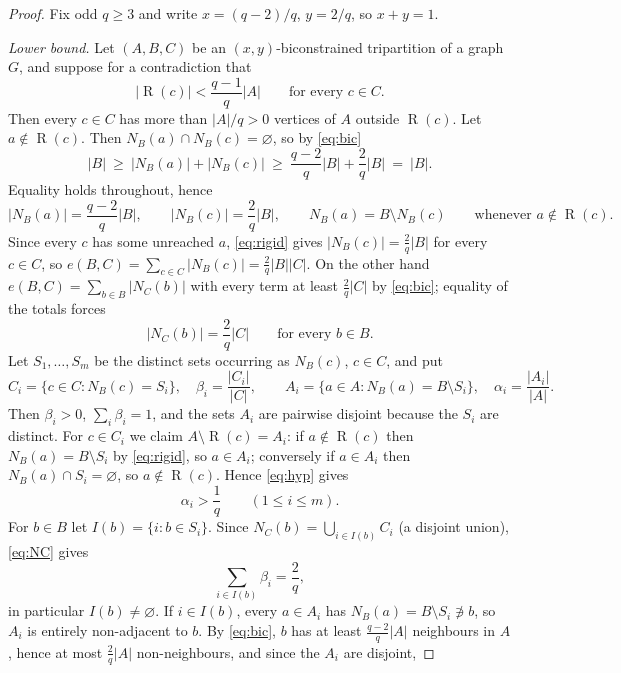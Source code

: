 \documentclass[11pt,a4paper]{article}
\theoremstyle{plain}
\theoremstyle{definition}
\theoremstyle{remark}
\newcommand{\NB}{N_B}
\newcommand{\NC}{N_C}
\DeclareMathOperator{\reach}{R}
\begin{document}
\label{pf:exact}
\lemexact*
\begin{proof}
Fix odd $q\ge3$ and write $x=(q-2)/q$, $y=2/q$, so $x+y=1$.

\emph{Lower bound.} Let $(A,B,C)$ be an $(x,y)$-biconstrained tripartition of a graph $G$, and suppose for a contradiction that
\begin{equation}\label{eq:hyp}
 |\reach(c)|<\frac{q-1}q|A|\qquad\text{for every }c\in C.
\end{equation}
Then every $c\in C$ has more than $|A|/q>0$ vertices of $A$ outside $\reach(c)$. Let $a\notin\reach(c)$. Then $\NB(a)\cap\NB(c)=\varnothing$, so by \eqref{eq:bic}
\[
 |B|\ \ge\ |\NB(a)|+|\NB(c)|\ \ge\ \frac{q-2}q|B|+\frac2q|B|\ =\ |B|.
\]
Equality holds throughout, hence
\begin{equation}\label{eq:rigid}
 |\NB(a)|=\frac{q-2}q|B|,\qquad |\NB(c)|=\frac2q|B|,\qquad \NB(a)=B\setminus\NB(c)\qquad\text{whenever }a\notin\reach(c).
\end{equation}
Since every $c$ has some unreached $a$, \eqref{eq:rigid} gives $|\NB(c)|=\frac2q|B|$ for every $c\in C$, so $e(B,C)=\sum_{c\in C}|\NB(c)|=\frac2q|B||C|$. On the other hand $e(B,C)=\sum_{b\in B}|\NC(b)|$ with every term at least $\frac2q|C|$ by \eqref{eq:bic}; equality of the totals forces
\begin{equation}\label{eq:NC}
 |\NC(b)|=\frac2q|C|\qquad\text{for every }b\in B.
\end{equation}
Let $S_1,\dots,S_m$ be the distinct sets occurring as $\NB(c)$, $c\in C$, and put
\[
 C_i=\{c\in C:\NB(c)=S_i\},\quad \beta_i=\frac{|C_i|}{|C|},\qquad A_i=\{a\in A:\NB(a)=B\setminus S_i\},\quad \alpha_i=\frac{|A_i|}{|A|}.
\]
Then $\beta_i>0$, $\sum_i\beta_i=1$, and the sets $A_i$ are pairwise disjoint because the $S_i$ are distinct. For $c\in C_i$ we claim $A\setminus\reach(c)=A_i$: if $a\notin\reach(c)$ then $\NB(a)=B\setminus S_i$ by \eqref{eq:rigid}, so $a\in A_i$; conversely if $a\in A_i$ then $\NB(a)\cap S_i=\varnothing$, so $a\notin\reach(c)$. Hence \eqref{eq:hyp} gives
\begin{equation}\label{eq:alpha}
 \alpha_i>\frac1q\qquad(1\le i\le m).
\end{equation}
For $b\in B$ let $I(b)=\{i:b\in S_i\}$. Since $\NC(b)=\bigcup_{i\in I(b)}C_i$ (a disjoint union), \eqref{eq:NC} gives
\begin{equation}\label{eq:beta}
 \sum_{i\in I(b)}\beta_i=\frac2q,
\end{equation}
in particular $I(b)\ne\varnothing$. If $i\in I(b)$, every $a\in A_i$ has $\NB(a)=B\setminus S_i\not\ni b$, so $A_i$ is entirely non-adjacent to $b$. By \eqref{eq:bic}, $b$ has at least $\frac{q-2}q|A|$ neighbours in $A$, hence at most $\frac2q|A|$ non-neighbours, and since the $A_i$ are disjoint,

\end{proof}
\end{document}
